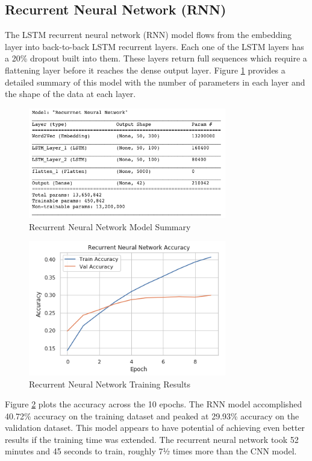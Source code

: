 \documentclass[5p,authoryear]{elsarticle}
\begin{document}
\subsection{Recurrent Neural Network (RNN)}


The LSTM recurrent neural network (RNN) model flows from the embedding layer into back-to-back LSTM recurrent layers. Each one of the LSTM layers has a 20\% dropout built into them. These layers return full sequences which require a flattening layer before it reaches the dense output layer. Figure \ref{RNN Summary} provides a detailed summary of this model with the number of parameters in each layer and the shape of the data at each layer.


\begin{figure}[!h] 
    \centering
	\includegraphics[width=3.4in]{figures/RNN_Model.png}
	\caption[]{Recurrent Neural Network Model Summary} 
	\label{RNN Summary} 
\end{figure}


\begin{figure}[!htb] \centering
	\includegraphics[width=3.4in]{figures/RNN_Accuracy.png}
	\caption[]{Recurrent Neural Network Training Results} 
	\label{RNN Results} 
\end{figure}


Figure \ref{RNN Results} plots the accuracy across the 10 epochs. The RNN model accomplished 40.72\% accuracy on the training dataset and peaked at 29.93\% accuracy on the validation dataset. This model appears to have potential of achieving even better results if the training time was extended. The recurrent neural network took 52 minutes and 45 seconds to train, roughly 7½ times more than the CNN model.
\end{document}
